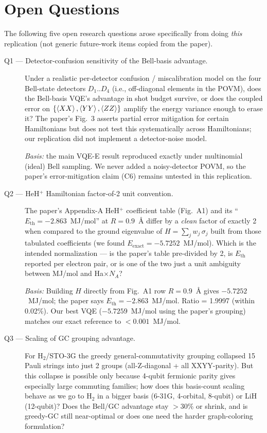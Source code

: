\section{Open Questions}

The following five open research questions arose specifically from doing
\emph{this} replication (not generic future-work items copied from the
paper).

\begin{description}
\item[Q1 --- Detector-confusion sensitivity of the Bell-basis advantage.]
Under a realistic per-detector confusion / miscalibration model on the four
Bell-state detectors $D_1..D_4$ (i.e., off-diagonal elements in the POVM),
does the Bell-basis VQE's advantage in shot budget survive, or does the
coupled error on $\{\braket{XX},\braket{YY},\braket{ZZ}\}$ amplify the
energy variance enough to erase it? The paper's Fig.~3 asserts partial
error mitigation for certain Hamiltonians but does not test this
systematically across Hamiltonians; our replication did not implement a
detector-noise model.

\emph{Basis:} the main VQE-E result reproduced exactly under multinomial
(ideal) Bell sampling. We never added a noisy-detector POVM, so the
paper's error-mitigation claim (C6) remains untested in this
replication.

\item[Q2 --- HeH$^+$ Hamiltonian factor-of-2 unit convention.]
The paper's Appendix-A HeH$^+$ coefficient table (Fig.~A1) and its
``$E_\mathrm{th}=-2.863$~MJ/mol'' at $R=0.9$~\AA{} differ by a
\emph{clean} factor of exactly 2 when compared to the ground eigenvalue of
$H=\sum_j w_j\,\sigma_j$ built from those tabulated coefficients (we found
$E_\mathrm{exact} = -5.7252$~MJ/mol). Which is the intended normalization
--- is the paper's table pre-divided by 2, is $E_\mathrm{th}$ reported
per electron pair, or is one of the two just a unit ambiguity between
MJ/mol and Ha$\times N_A$?

\emph{Basis:} Building $H$ directly from Fig.~A1 row $R=0.9$~\AA{} gives
$-5.7252$~MJ/mol; the paper says $E_\mathrm{th}=-2.863$~MJ/mol. Ratio =
1.9997 (within 0.02\%). Our best VQE ($-5.7259$~MJ/mol using the paper's
grouping) matches our exact reference to $<0.001$~MJ/mol.

\item[Q3 --- Scaling of GC grouping advantage.]
For H$_2$/STO-3G the greedy general-commutativity grouping collapsed 15
Pauli strings into just 2 groups (all-Z-diagonal + all XXYY-parity). But
this collapse is possible only because 4-qubit fermionic parity gives
especially large commuting families; how does this basis-count scaling
behave as we go to H$_2$ in a bigger basis (6-31G, 4-orbital, 8-qubit) or
LiH (12-qubit)? Does the Bell/GC advantage stay $>30\%$ or shrink, and is
greedy-GC still near-optimal or does one need the harder graph-coloring
formulation?


\end{description}
